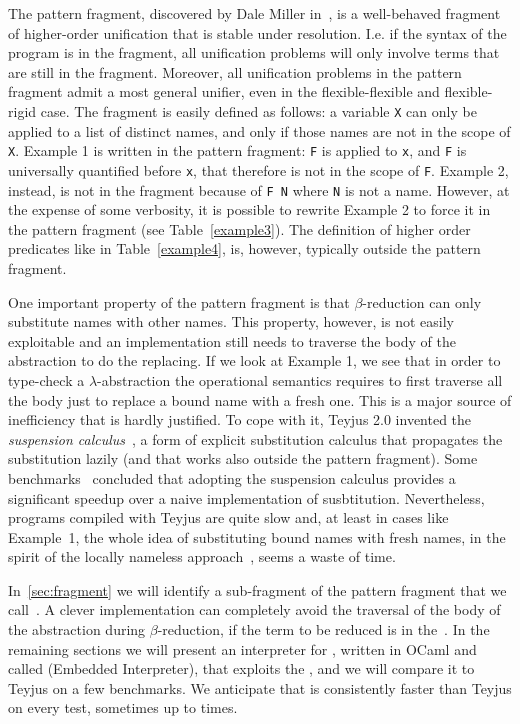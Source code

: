 \documentclass{llncs}
\begin{document}
The pattern fragment, discovered by Dale Miller in~\cite{???}, is a well-behaved fragment of higher-order unification that is stable under \lp{} resolution. I.e. if the syntax of the program is in the fragment, all unification problems will only involve terms that are still in the fragment. Moreover, all unification problems in the pattern fragment admit a most general unifier, even in the flexible-flexible and flexible-rigid case. The fragment is easily defined as follows: a variable \verb+X+ can only be applied to a list of distinct names, and only if those names are not in the scope of \verb+X+.
Example 1 is written in the pattern fragment: \verb+F+ is applied to \verb+x+,
and \verb+F+ is universally quantified before \verb+x+, that therefore is not
in the scope of \verb+F+. Example 2, instead, is not in the fragment because
of \verb+F N+ where \verb+N+ is not a name. However, at the expense of some
verbosity, it is possible to rewrite Example 2 to force it in the pattern
fragment (see Table~\ref{example3}). The definition of higher order predicates
like in Table~\ref{example4}, is, however, typically outside the pattern
fragment.

One important property of the pattern fragment is that $\beta$-reduction can
only substitute names with other names. This property, however, is not
easily exploitable and an implementation still needs to traverse the body
of the abstraction to do the replacing. If we look at Example 1, we see that
in order to type-check a $\lambda$-abstraction the operational semantics
requires to first traverse all the body just to replace a bound name with a
fresh one. This is a major source of inefficiency that is hardly justified.
To cope with it, Teyjus 2.0 invented the \emph{suspension calculus}~\cite{susp1,susp2}, a form of explicit substitution calculus that propagates the substitution lazily (and that works also outside the pattern fragment). Some benchmarks~\cite{susp3} concluded that adopting the suspension calculus provides a significant speedup over a naive implementation of susbtitution. Nevertheless, programs compiled with Teyjus are quite slow and, at least in cases like Example~1, the whole idea of substituting bound names with fresh names, in the spirit of the locally nameless approach~\cite{???}, seems a waste of time.

In~\ref{sec:fragment} we will identify a sub-fragment of the pattern fragment
that we call~\frag. A clever implementation can completely avoid the traversal of the body of the abstraction during $\beta$-reduction, if the term to be reduced is in the~\frag.
In the remaining sections we will present an interpreter
for \lp, written in OCaml and called \elpi{} (Embedded \lp{} Interpreter), that exploits the \frag, and we will compare it to Teyjus on a few benchmarks.
We anticipate that \elpi{} is consistently faster than Teyjus on every test, sometimes up to  times.
\end{document}
